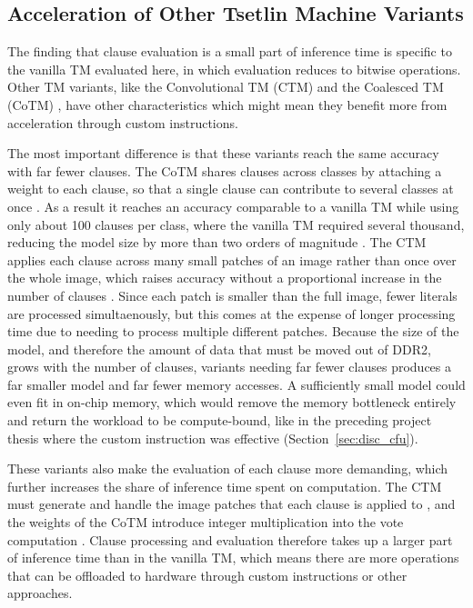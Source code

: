 \subsection{Acceleration of Other Tsetlin Machine Variants}
\label{sec:disc_variants}

The finding that clause evaluation is a small part of inference time is specific to the vanilla TM evaluated here, in which evaluation reduces to bitwise operations. Other TM variants, like the Convolutional TM (CTM) and the Coalesced TM (CoTM) \cite{GranmoOle-Christoffer2019TCTM,GlimsdalSondre2021CMTM}, have other characteristics which might mean they benefit more from acceleration through custom instructions.

The most important difference is that these variants reach the same accuracy with far fewer clauses. The CoTM shares clauses across classes by attaching a weight to each clause, so that a single clause can contribute to several classes at once \cite{GlimsdalSondre2021CMTM}. As a result it reaches an accuracy comparable to a vanilla TM while using only about 100 clauses per class, where the vanilla TM required several thousand, reducing the model size by more than two orders of magnitude \cite{GlimsdalSondre2021CMTM}. The CTM applies each clause across many small patches of an image rather than once over the whole image, which raises accuracy without a proportional increase in the number of clauses \cite{GranmoOle-Christoffer2019TCTM}. Since each patch is smaller than the full image, fewer literals are processed simultaenously, but this comes at the expense of longer processing time due to needing to process multiple different patches. Because the size of the model, and therefore the amount of data that must be moved out of DDR2, grows with the number of clauses, variants needing far fewer clauses produces a far smaller model and far fewer memory accesses. A sufficiently small model could even fit in on-chip memory, which would remove the memory bottleneck entirely and return the workload to be compute-bound, like in the preceding project thesis where the custom instruction was effective (Section~\ref{sec:disc_cfu}).

These variants also make the evaluation of each clause more demanding, which further increases the share of inference time spent on computation. The CTM must generate and handle the image patches that each clause is applied to \cite{GranmoOle-Christoffer2019TCTM}, and the weights of the CoTM introduce integer multiplication into the vote computation \cite{GlimsdalSondre2021CMTM}. Clause processing and evaluation therefore takes up a larger part of inference time than in the vanilla TM, which means there are more operations that can be offloaded to hardware through custom instructions or other approaches.

